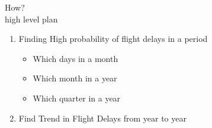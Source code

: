 \documentclass[10pt]{beamer}
\begin{document}
\begin{frame}{How? \\ \small high level plan}

\begin{enumerate}
    \item Finding High probability of flight delays in a period
    \begin{itemize}
        \item Which days in a month
        \item Which month in a year
        \item Which quarter in a year
    \end{itemize}
    \item Find Trend in Flight Delays from year to year
\end{enumerate}


\end{frame}
\end{document}
